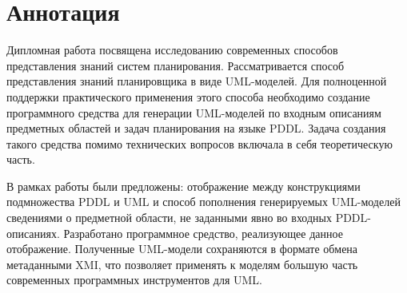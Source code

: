 \chapter*{Аннотация}
\iffalse
    Дипломная работа посвящена разработке средства, осуществляющего трансляцию описаний предметных областей и задач планирования на языке PDDL в модели языка UML. 
Разработанное программное средство осуществляет трансляцию в формат XMI, который является стандартом обмена UML-моделями. 
Полученные модели в виде файлов XMI позднее могут быть открыты и обработаны в различных приложениях, например, Eclipse Papyrus.
\fi

Дипломная работа посвящена исследованию современных способов представления знаний систем планирования. Рассматривается способ представления знаний планировщика в виде UML-моделей. Для полноценной поддержки практического применения этого способа необходимо создание программного средства для генерации UML-моделей по входным описаниям предметных областей и задач планирования на языке PDDL. Задача создания такого средства помимо технических вопросов включала в себя теоретическую часть.

В рамках работы были предложены: отображение между конструкциями подмножества PDDL и UML и способ пополнения генерируемых UML-моделей сведениями о предметной области, не заданными явно во входных PDDL-описаниях. Разработано программное средство, реализующее данное отображение. Полученные UML-модели сохраняются в формате обмена метаданными XMI, что позволяет применять к моделям большую часть современных программных инструментов для UML.